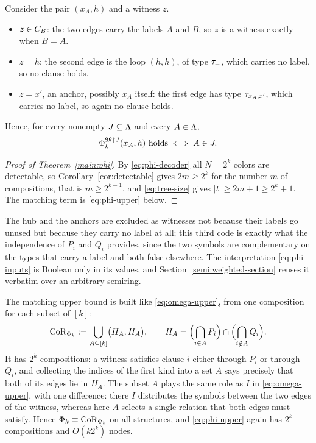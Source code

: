 Consider the pair $(x_A,h)$ and a witness $z$.
\begin{itemize}[nosep]
\item $z\in C_{B}$: the two edges carry the labels $A$ and $B$, so $z$ is a
 witness exactly when $B=A$.
\item $z=h$: the second edge is the loop $(h,h)$, of type $\tau_{=}$, which
 carries no label, so no clause holds.
\item $z=x'$, an anchor, possibly $x_A$ itself: the first edge has type
 $\tau_{x_A,x'}$, which carries no label, so again no clause holds.
\end{itemize}
Hence, for every nonempty $J\subseteq\Lambda$ and every $A\in\Lambda$,
\begin{equation}\label{eq:phi-decoder}
 \Phi_k^{\mathfrak M\mathord{\restriction} J}(x_A,h)\ \text{holds}\iff A\in J.
\end{equation}

\begin{proof}[Proof of Theorem~\ref{main:phi}]
By \eqref{eq:phi-decoder} all $N=2^k$ colors are detectable, so
Corollary~\ref{cor:detectable} gives $2m\ge2^k$ for the number $m$ of
compositions, that is $m\ge2^{k-1}$, and \eqref{eq:tree-size} gives
$|t|\ge2m+1\ge2^k+1$. The matching term is \eqref{eq:phi-upper} below.
\end{proof}

The hub and the anchors are
excluded as witnesses not because their labels go unused but because they
carry no label at all; this third code is exactly what the independence of
$P_i$ and $Q_i$ provides, since the two symbols are complementary on the
types that carry a label and both false elsewhere. The interpretation
\eqref{eq:phi-inputs} is Boolean only in its values, and
Section~\ref{semi:weighted-section} reuses it verbatim over an arbitrary
semiring.

The matching upper bound is built like \eqref{eq:omega-upper}, from one
composition for each subset of $[k]$:
\begin{equation}\label{eq:phi-upper}
 \mathrm{CoR}_{\Phi_k}:=\bigcup_{A\subseteq[k]}\bigl(H_A;H_A\bigr),
 \qquad
 H_A=\Bigl(\bigcap_{i\in A}P_i\Bigr)\cap\Bigl(\bigcap_{i\notin A}Q_i\Bigr).
\end{equation}
It has $2^k$ compositions: a witness satisfies clause $i$ either through
$P_i$ or through $Q_i$, and collecting the indices of the first kind into a
set $A$ says precisely that both of its edges lie in $H_A$. The subset $A$
plays the same role as $I$ in \eqref{eq:omega-upper}, with one difference:
there $I$ distributes the symbols between the two edges of the witness,
whereas here $A$ selects a single relation that both edges must satisfy.
Hence $\Phi_k\equiv\mathrm{CoR}_{\Phi_k}$ on all structures, and
\eqref{eq:phi-upper} again has $2^k$ compositions and $O(k2^k)$ nodes.


